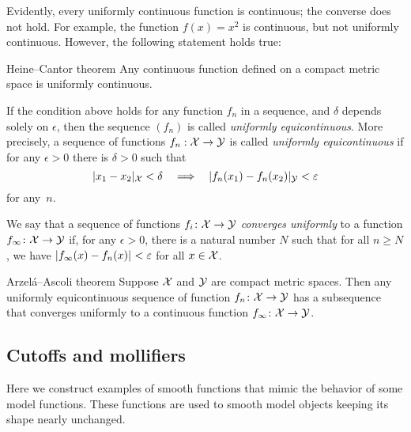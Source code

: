 Evidently, every uniformly continuous function is continuous;
the converse does not hold.
For example, the function $f(x)=x^2$ is continuous, but not uniformly continuous.
However, the following statement holds true:

\begin{thm}{Heine--Cantor theorem}
Any continuous function defined on a compact metric space is uniformly continuous.
\end{thm}

If the condition above holds for any function $f_n$ in a sequence, and $\delta$ depends solely on $\epsilon$,
then the sequence $(f_n)$ is called \emph{uniformly equicontinuous}.
More precisely, 
a sequence of functions $f_n:{\mathcal{X}}\to \mathcal{Y}$ is called {}\emph{uniformly equicontinuous} if 
for any $\epsilon>0$ there is $\delta>0$ such that 
\[\dist{x_1}{x_2}{\spc{X}}<\delta\quad\Longrightarrow\quad \dist{f_n(x_1)}{f_n(x_2)}{\spc{Y}}<\epsilon\]
for any~$n$.


We say that a sequence of functions $f_i\colon {\mathcal{X}} \to \mathcal{Y}$ \emph{converges uniformly} to a function $f_{\infty}\colon {\mathcal{X}} \to \mathcal{Y}$ if, for any 
$\epsilon>0$, there is a natural number $N$ such that for all $n \ge N$, we have $\dist{f_{\infty}(x)}{f_n (x)}{}<\epsilon$
for all $x  \in {\mathcal{X}}$.

\begin{thm}{Arzel\'{a}--Ascoli theorem}\label{lem:equicontinuous}
Suppose $\mathcal{X}$ and $\mathcal{Y}$ are compact metric spaces. 
Then any uniformly equicontinuous sequence of function $f_n\:\spc{X}\z\to \spc{Y}$ has a subsequence that converges uniformly to a continuous function $f_\infty\colon\mathcal{X}\to \mathcal{Y}$. 
\end{thm}

\subsection*{Cutoffs and mollifiers}

Here we construct examples of smooth functions that mimic the behavior of some model functions.
These functions are used to smooth model objects keeping its shape nearly unchanged.


